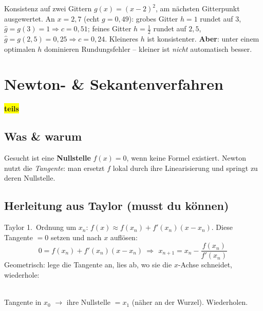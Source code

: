 \documentclass[a4paper,11pt]{article}
\newcommand{\chip}[2]{{\setlength{\fboxsep}{2.5pt}\colorbox{#1}{\color{bgdark}\footnotesize\bfseries #2}}}
\newcommand{\teils}{\chip{yellow}{teils}}
\begin{document}
\begin{rechnung}{Konsistenz auf zwei Gittern}
$g(x)=(x-2)^2$, am nächsten Gitterpunkt ausgewertet. An $x=2{,}7$ (echt $g=0{,}49$):
grobes Gitter $h=1$ rundet auf $3$, $\hat g=g(3)=1\Rightarrow c=0{,}51$;
feines Gitter $h=\tfrac12$ rundet auf $2{,}5$, $\hat g=g(2{,}5)=0{,}25\Rightarrow c=0{,}24$.
Kleineres $h$ ist konsistenter. \textbf{Aber}: unter einem optimalen $h$ dominieren Rundungsfehler
-- kleiner ist \emph{nicht} automatisch besser.
\end{rechnung}

\section{Newton- \& Sekantenverfahren}
\teils

\subsection{Was \& warum}
Gesucht ist eine \textbf{Nullstelle} $f(x)=0$, wenn keine Formel existiert. Newton nutzt die
\emph{Tangente}: man ersetzt $f$ lokal durch ihre Linearisierung und springt zu deren Nullstelle.

\subsection{Herleitung aus Taylor (musst du können)}
Taylor 1.\ Ordnung um $x_n$: $f(x)\approx f(x_n)+f'(x_n)(x-x_n)$. Diese Tangente $=0$ setzen und nach
$x$ auflösen:
\[
  0=f(x_n)+f'(x_n)(x-x_n)\ \Longrightarrow\
  \boxed{\,x_{n+1}=x_n-\dfrac{f(x_n)}{f'(x_n)}\,}
\]
Geometrisch: lege die Tangente an, lies ab, wo sie die $x$-Achse schneidet, wiederhole:

\begin{center}
\\[-2pt]
{\footnotesize\color{muted}Tangente in $x_0$ $\to$ ihre Nullstelle $=x_1$ (näher an der Wurzel). Wiederholen.}
\end{center}
\end{document}
